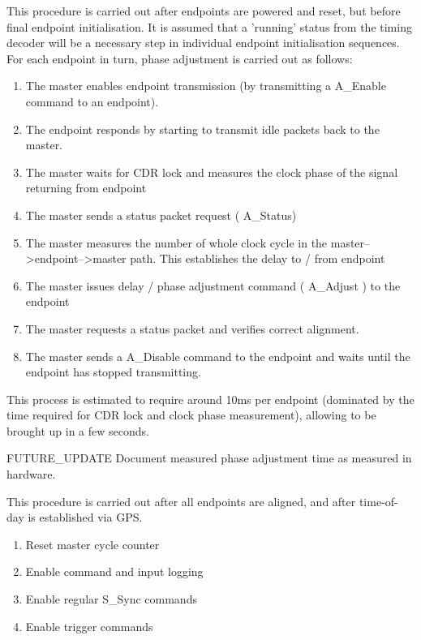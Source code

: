 \documentclass{dune}
\begin{document}

This procedure is carried out after endpoints are powered and reset, but before final endpoint initialisation. It is assumed that a 'running' status from the timing decoder will be a necessary step in individual endpoint initialisation sequences. For each endpoint in turn, phase adjustment is carried out as follows:

\begin{enumerate}
	\item The master enables endpoint transmission (by transmitting a A\_Enable command to an endpoint). 
	\item The endpoint responds by starting to transmit idle packets back to the master.
	\item The master waits for CDR lock and measures the clock phase of the signal returning from endpoint
	\item The master sends a status packet request ( A\_Status)
	\item The master measures the number of whole clock cycle in the master-->endpoint-->master path. This establishes the delay to / from endpoint
	\item The master issues delay / phase adjustment command ( A\_Adjust ) to the endpoint
	\item The master requests a status packet and verifies correct alignment.
	\item The master sends a A\_Disable command to the endpoint and waits until the endpoint has stopped transmitting.
\end{enumerate}

This process is estimated to require around 10ms per endpoint (dominated by the time required for CDR lock and clock phase measurement), allowing  to be brought up in a few seconds.

{\color{red}FUTURE\_UPDATE} Document measured phase adjustment time as measured in hardware.


This procedure is carried out after all endpoints are aligned, and after time-of-day is established via GPS.

\begin{enumerate}
	\item Reset master cycle counter
	\item Enable command and input logging
	\item Enable regular S\_Sync commands
	\item Enable trigger commands
\end{enumerate}
\end{document}
